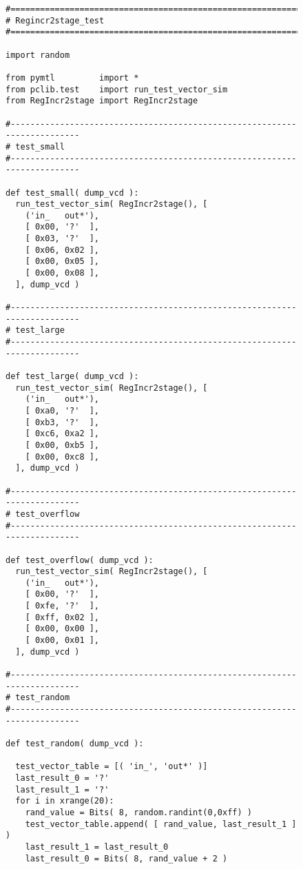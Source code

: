
\begin{figure}
  \vspace*{-0.2in}

  \begin{lstlisting}[xleftmargin={0.9in}]
#=========================================================================
# Regincr2stage_test
#=========================================================================

import random

from pymtl         import *
from pclib.test    import run_test_vector_sim
from RegIncr2stage import RegIncr2stage

#-------------------------------------------------------------------------
# test_small
#-------------------------------------------------------------------------

def test_small( dump_vcd ):
  run_test_vector_sim( RegIncr2stage(), [
    ('in_   out*'),
    [ 0x00, '?'  ],
    [ 0x03, '?'  ],
    [ 0x06, 0x02 ],
    [ 0x00, 0x05 ],
    [ 0x00, 0x08 ],
  ], dump_vcd )

#-------------------------------------------------------------------------
# test_large
#-------------------------------------------------------------------------

def test_large( dump_vcd ):
  run_test_vector_sim( RegIncr2stage(), [
    ('in_   out*'),
    [ 0xa0, '?'  ],
    [ 0xb3, '?'  ],
    [ 0xc6, 0xa2 ],
    [ 0x00, 0xb5 ],
    [ 0x00, 0xc8 ],
  ], dump_vcd )

#-------------------------------------------------------------------------
# test_overflow
#-------------------------------------------------------------------------

def test_overflow( dump_vcd ):
  run_test_vector_sim( RegIncr2stage(), [
    ('in_   out*'),
    [ 0x00, '?'  ],
    [ 0xfe, '?'  ],
    [ 0xff, 0x02 ],
    [ 0x00, 0x00 ],
    [ 0x00, 0x01 ],
  ], dump_vcd )

#-------------------------------------------------------------------------
# test_random
#-------------------------------------------------------------------------

def test_random( dump_vcd ):

  test_vector_table = [( 'in_', 'out*' )]
  last_result_0 = '?'
  last_result_1 = '?'
  for i in xrange(20):
    rand_value = Bits( 8, random.randint(0,0xff) )
    test_vector_table.append( [ rand_value, last_result_1 ] )
    last_result_1 = last_result_0
    last_result_0 = Bits( 8, rand_value + 2 )


\end{lstlisting}
\end{figure}
